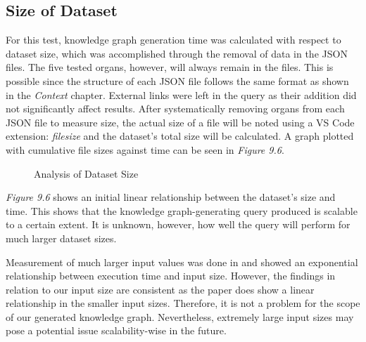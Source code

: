 \subsection{Size of Dataset}
\hspace{0.5cm} For this test, knowledge graph generation time was calculated with respect to dataset size, which was accomplished through the removal of data in the JSON files. The five tested organs, however, will always remain in the files. This is possible since the structure of each JSON file follows the same format as shown in the \textit{Context} chapter. External links were left in the query as their addition did not significantly affect results. After systematically removing organs from each JSON file to measure size, the actual size of a file will be noted using a VS Code extension: \textit{filesize} and the dataset's total size will be calculated. A graph plotted with cumulative file sizes against time can be seen in \textit{Figure 9.6}.

\begin{figure}[H]
\begin{center}
\end{center}
\vspace{-0.75cm}
\caption{Analysis of Dataset Size}
\end{figure}

\textit{Figure 9.6} shows an initial linear relationship between the dataset's size and time. This shows that the knowledge graph-generating query produced is scalable to a certain extent. It is unknown, however, how well the query will perform for much larger dataset sizes. 

Measurement of much larger input values was done in \cite{sparqlanything} and showed an exponential relationship between execution time and input size. However, the findings in relation to our input size are consistent as the paper does show a linear relationship in the smaller input sizes. Therefore, it is not a problem for the scope of our generated knowledge graph. Nevertheless, extremely large input sizes may pose a potential issue scalability-wise in the future.


